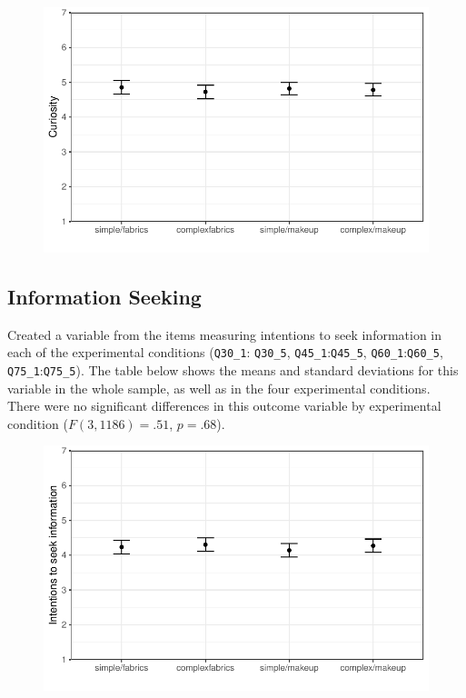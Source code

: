 \documentclass[
]{article}
\begin{document}
\begin{figure}

{\centering \includegraphics{BioMADE-fall2025-data-analysis_files/figure-pdf/curious-1.pdf}

}

\end{figure}

\hypertarget{information-seeking}{%
\subsection{Information Seeking}\label{information-seeking}}

Created a variable from the items measuring intentions to seek
information in each of the experimental conditions (\texttt{Q30\_1}:
\texttt{Q30\_5}, \texttt{Q45\_1}:\texttt{Q45\_5},
\texttt{Q60\_1}:\texttt{Q60\_5}, \texttt{Q75\_1}:\texttt{Q75\_5}). The
table below shows the means and standard deviations for this variable in
the whole sample, as well as in the four experimental conditions. There
were no significant differences in this outcome variable by experimental
condition (\(F(3, 1186) = .51\), \(p = .68\)).

\begin{figure}

{\centering \includegraphics{BioMADE-fall2025-data-analysis_files/figure-pdf/infoseek-1.pdf}

}

\end{figure}
\end{document}
